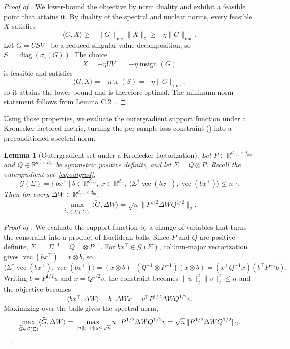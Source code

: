 \documentclass[11pt]{article}
\renewcommand{\vec}{\operatorname{vec}}
\newcommand{\R}{\mathbb{R}}
\DeclareMathOperator{\diag}{diag}
\DeclareMathOperator{\Tr}{tr}
\newcommand{\ip}[1]{\langle #1 \rangle}
\DeclareMathOperator{\msign}{msign}
\newcommand{\norm}[1]{\| #1\|}
\theoremstyle{plain}
\newtheorem{lemma}{Lemma}
\theoremstyle{definition}
\theoremstyle{remark}
\theoremstyle{definition}
\begin{document}
\begin{proof}[Proof of ]
We lower-bound the objective by norm duality and exhibit a feasible point that
attains it. By duality of the spectral and nuclear norms, every feasible $X$
satisfies
\[
    \ip{G,X}
    \geq
    -\norm{G}_{\mathrm{nuc}}\norm{X}_2
    \geq
    -\eta\norm{G}_{\mathrm{nuc}}.
\]
Let $G=USV^\top$ be a reduced singular value decomposition, so
$S=\diag(\sigma_i(G))$. The choice
\[
    X=-\eta UV^\top=-\eta\msign(G)
\]
is feasible and satisfies
\[
    \ip{G,X}
    =
    -\eta\Tr(S)
    =
    -\eta\norm{G}_{\mathrm{nuc}},
\]
so it attains the lower bound and is therefore optimal. The minimum-norm
statement follows from Lemma C.2~\cite{parshakova2026muon}.
\end{proof}

Using those properties, we evaluate the outergradient support function under a Kronecker-factored metric, turning the per-sample loss constraint () into a preconditioned spectral norm.
\begin{lemma}[Outergradient set under a Kronecker factorization]
\label{lem:pseudogradient-spectral}
Let
$P\in\R^{d_{\mathrm{out}}\times d_{\mathrm{out}}}$ and
$Q\in\R^{d_{\mathrm{in}}\times d_{\mathrm{in}}}$ be symmetric positive definite,
and let $\Sigma=Q\otimes P$. Recall the outergradient set~\eqref{eq:outgrad},
\[
\mathcal{G}(\Sigma)=\bigl\{\, bx^\top ~\big|~ b\in\R^{d_{\mathrm{out}}},\ x\in\R^{d_{\mathrm{in}}},\ \ip{\Sigma^\dagger\vec(bx^\top),\vec(bx^\top)}\leq n \,\bigr\}.
\]
Then for every $\Delta W\in\R^{d_{\mathrm{out}}\times d_{\mathrm{in}}}$,
\[
  \max_{\widetilde{G} \in \mathcal{G}(\Sigma)} \ip{ \widetilde{G} , \Delta W}
  =\sqrt{n}\norm{P^{1/2}\Delta W Q^{1/2}}_2 .
\]
\end{lemma}

\begin{proof}[Proof of ]
We evaluate the support function by a change of variables that turns the
constraint into a product of Euclidean balls. Since $P$ and $Q$ are positive
definite, $\Sigma^\dagger=\Sigma^{-1}=Q^{-1}\otimes P^{-1}$. For
$bx^\top\in\mathcal{G}(\Sigma)$, column-major vectorization gives
$\vec(bx^\top)=x\otimes b$, so
\[
\ip{\Sigma^\dagger\vec(bx^\top),\vec(bx^\top)}
=(x\otimes b)^\top(Q^{-1}\otimes P^{-1})(x\otimes b)
=(x^\top Q^{-1}x)(b^\top P^{-1}b).
\]
Writing $b=P^{1/2}u$ and $x=Q^{1/2}v$, the constraint becomes
$\norm{u}_2^2\norm{v}_2^2\leq n$ and the objective becomes
\[
\ip{bx^\top,\Delta W}=b^\top\Delta W x=u^\top P^{1/2}\Delta W Q^{1/2}v .
\]
Maximizing over the balls gives the spectral norm,
\[
\max_{\widetilde{G}\in\mathcal{G}(\Sigma)}\ip{\widetilde{G},\Delta W}
=\max_{\norm{u}_2\norm{v}_2\leq\sqrt{n}}u^\top P^{1/2}\Delta W Q^{1/2}v
=\sqrt{n}\,\norm{P^{1/2}\Delta W Q^{1/2}}_2. \qedhere
\]
\end{proof}
\end{document}
